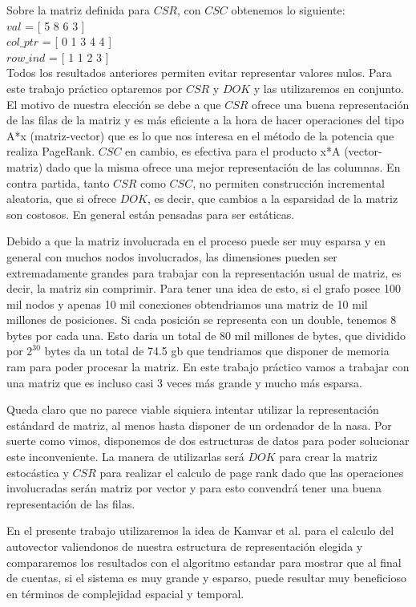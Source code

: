 Sobre la matriz definida para $CSR$, con $CSC$ obtenemos lo siguiente: \\

   $val$  = [ 5 8 6 3 ] \\
   $col\_ptr$ = [ 0 1 3 4 4 ] \\   
   $row\_ind$ = [ 1 1 2 3 ] \\

Todos los resultados anteriores permiten evitar representar valores nulos.
Para este trabajo práctico optaremos por $CSR$ y $DOK$ y las utilizaremos en conjunto.  	
El motivo de nuestra elección se debe a que $CSR$ ofrece una buena representación de las filas de la matriz y es más eficiente a la hora de hacer operaciones del tipo A*x (matriz-vector) que es lo que nos interesa en el método de la potencia que realiza PageRank. $CSC$ en cambio, es efectiva para el producto x*A (vector-matriz) dado que la misma ofrece una mejor representación de las columnas. En contra partida, tanto $CSR$ como $CSC$, no permiten construcción incremental aleatoria, que si ofrece $DOK$, es decir, que cambios a la esparsidad de la matriz son costosos. En general están pensadas para ser estáticas.

Debido a que la matriz involucrada en el proceso puede ser muy esparsa y en general con muchos nodos involucrados, las dimensiones pueden ser extremadamente grandes para trabajar con la representación usual de matriz, es decir, la matriz sin comprimir. Para tener una idea de esto, si el grafo posee 100 mil nodos y apenas 10 mil conexiones obtendriamos una matriz de 10 mil millones de posiciones. Si cada posición se representa con un double, tenemos 8 bytes por cada una. Esto daria un total de 80 mil millones de bytes, que dividido por $2^{30}$ bytes da un total de 74.5 gb que tendriamos que disponer de memoria ram para poder procesar la matriz. En este trabajo práctico vamos a trabajar con una matriz que es incluso casi 3 veces más grande y mucho más esparsa.  

Queda claro que no parece viable siquiera intentar utilizar la representación estándard de matriz, al menos hasta disponer de un ordenador de la nasa. Por suerte como vimos, disponemos de dos estructuras de datos para poder solucionar este inconveniente. La manera de utilizarlas será $DOK$ para crear la matriz estocástica y $CSR$ para realizar el calculo de page rank dado que las operaciones involucradas serán matriz por vector y para esto convendrá tener una buena representación de las filas.  

En el presente trabajo utilizaremos la idea de Kamvar et al. \cite[Algoritmo 1]{Kamvar2003} para el calculo del autovector valiendonos de nuestra estructura de representación elegida y compararemos los resultados con el algoritmo estandar para mostrar que al final de cuentas, si el sistema es muy grande y esparso, puede resultar muy beneficioso en términos de complejidad espacial y temporal.


